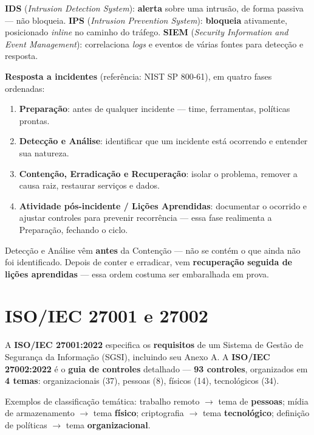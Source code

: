 \begin{conceito}
\textbf{IDS} (\textit{Intrusion Detection System}): \textbf{alerta} sobre
uma intrusão, de forma passiva --- não bloqueia. \textbf{IPS}
(\textit{Intrusion Prevention System}): \textbf{bloqueia} ativamente,
posicionado \textit{inline} no caminho do tráfego. \textbf{SIEM}
(\textit{Security Information and Event Management}): correlaciona
\textit{logs} e eventos de várias fontes para detecção e resposta.

\textbf{Resposta a incidentes} (referência: NIST SP 800-61), em quatro
fases ordenadas:
\begin{enumerate}
\item \textbf{Preparação}: antes de qualquer incidente --- time,
ferramentas, políticas prontas.
\item \textbf{Detecção e Análise}: identificar que um incidente está
ocorrendo e entender sua natureza.
\item \textbf{Contenção, Erradicação e Recuperação}: isolar o problema,
remover a causa raiz, restaurar serviços e dados.
\item \textbf{Atividade pós-incidente / Lições Aprendidas}: documentar o
ocorrido e ajustar controles para prevenir recorrência --- essa fase
realimenta a Preparação, fechando o ciclo.
\end{enumerate}
\end{conceito}

\begin{cuidado}
Detecção e Análise vêm \textbf{antes} da Contenção --- não se contém o
que ainda não foi identificado. Depois de conter e erradicar, vem
\textbf{recuperação seguida de lições aprendidas} --- essa ordem costuma
ser embaralhada em prova.
\end{cuidado}

\section{ISO/IEC 27001 e 27002}

\begin{conceito}
A \textbf{ISO/IEC 27001:2022} especifica os \textbf{requisitos} de um
Sistema de Gestão de Segurança da Informação (SGSI), incluindo seu Anexo
A. A \textbf{ISO/IEC 27002:2022} é o \textbf{guia de controles} detalhado
--- \textbf{93 controles}, organizados em \textbf{4 temas}:
organizacionais (37), pessoas (8), físicos (14), tecnológicos (34).

Exemplos de classificação temática: trabalho remoto $\to$ tema de
\textbf{pessoas}; mídia de armazenamento $\to$ tema \textbf{físico};
criptografia $\to$ tema \textbf{tecnológico}; definição de políticas
$\to$ tema \textbf{organizacional}.
\end{conceito}


